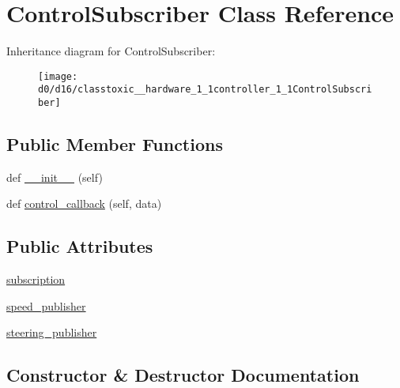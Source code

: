 \hypertarget{classtoxic__hardware_1_1controller_1_1ControlSubscriber}{}\section{Control\+Subscriber Class Reference}
\label{classtoxic__hardware_1_1controller_1_1ControlSubscriber}
Inheritance diagram for Control\+Subscriber\+:\begin{figure}[H]
\begin{center}
\leavevmode
\texttt{[image: d0/d16/classtoxic\_\_hardware\_1\_1controller\_1\_1ControlSubscriber]}
\end{center}
\end{figure}
\subsection*{Public Member Functions}
\begin{DoxyCompactItemize}
\item 
def \mbox{\hyperlink{classtoxic__hardware_1_1controller_1_1ControlSubscriber_ae64f0875afe3067b97ba370b354b9213}{\+\_\+\+\_\+init\+\_\+\+\_\+}} (self)
\item 
def \mbox{\hyperlink{classtoxic__hardware_1_1controller_1_1ControlSubscriber_a33e86027586e42bbaff819e19bef44d7}{control\+\_\+callback}} (self, data)
\end{DoxyCompactItemize}
\subsection*{Public Attributes}
\begin{DoxyCompactItemize}
\item 
\mbox{\hyperlink{classtoxic__hardware_1_1controller_1_1ControlSubscriber_a4b0698733c4dfaffe8e2b4cd952b6f82}{subscription}}
\item 
\mbox{\hyperlink{classtoxic__hardware_1_1controller_1_1ControlSubscriber_a2c40ddb28f990d22e258f62732f23fa4}{speed\+\_\+publisher}}
\item 
\mbox{\hyperlink{classtoxic__hardware_1_1controller_1_1ControlSubscriber_a194634798f6a458c7f9750bcd232fbbc}{steering\+\_\+publisher}}
\end{DoxyCompactItemize}


\subsection{Constructor \& Destructor Documentation}
\mbox{\label{classtoxic__hardware_1_1controller_1_1ControlSubscriber_ae64f0875afe3067b97ba370b354b9213}} 
